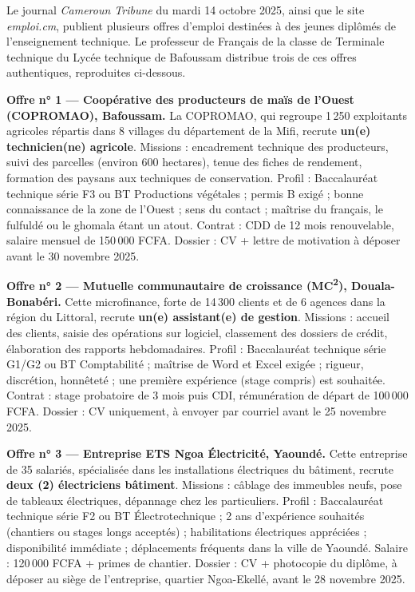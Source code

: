 \documentclass[11pt]{article}
\newcounter{popsec}
\newcounter{popsub}
\newcommand{\courssub}[1]{%
  \stepcounter{popsub}%
  \par\vspace{9pt}\noindent{\popxbold\fontsize{11.5}{13}\selectfont\color{popink}{\color{poporange}\thepopsec.\thepopsub}\hspace{6pt}#1}\par\nopagebreak\vspace{4pt}
}
\begin{document}
\courssub{Situation déclenchante}

Le journal \emph{Cameroun Tribune} du mardi 14 octobre 2025, ainsi que le site \emph{emploi.cm}, publient plusieurs offres d'emploi destinées à des jeunes diplômés de l'enseignement technique. Le professeur de Français de la classe de Terminale technique du Lycée technique de Bafoussam distribue trois de ces offres authentiques, reproduites ci-dessous.

\textbf{Offre n° 1 — Coopérative des producteurs de maïs de l'Ouest (COPROMAO), Bafoussam.} La COPROMAO, qui regroupe 1\,250 exploitants agricoles répartis dans 8 villages du département de la Mifi, recrute \textbf{un(e) technicien(ne) agricole}. Missions : encadrement technique des producteurs, suivi des parcelles (environ 600 hectares), tenue des fiches de rendement, formation des paysans aux techniques de conservation. Profil : Baccalauréat technique série F3 ou BT Productions végétales ; permis B exigé ; bonne connaissance de la zone de l'Ouest ; sens du contact ; maîtrise du français, le fulfuldé ou le ghomala étant un atout. Contrat : CDD de 12 mois renouvelable, salaire mensuel de 150\,000 FCFA. Dossier : CV + lettre de motivation à déposer avant le 30 novembre 2025.

\textbf{Offre n° 2 — Mutuelle communautaire de croissance (MC\textsuperscript{2}), Douala-Bonabéri.} Cette microfinance, forte de 14\,300 clients et de 6 agences dans la région du Littoral, recrute \textbf{un(e) assistant(e) de gestion}. Missions : accueil des clients, saisie des opérations sur logiciel, classement des dossiers de crédit, élaboration des rapports hebdomadaires. Profil : Baccalauréat technique série G1/G2 ou BT Comptabilité ; maîtrise de Word et Excel exigée ; rigueur, discrétion, honnêteté ; une première expérience (stage compris) est souhaitée. Contrat : stage probatoire de 3 mois puis CDI, rémunération de départ de 100\,000 FCFA. Dossier : CV uniquement, à envoyer par courriel avant le 25 novembre 2025.

\textbf{Offre n° 3 — Entreprise ETS Ngoa Électricité, Yaoundé.} Cette entreprise de 35 salariés, spécialisée dans les installations électriques du bâtiment, recrute \textbf{deux (2) électriciens bâtiment}. Missions : câblage des immeubles neufs, pose de tableaux électriques, dépannage chez les particuliers. Profil : Baccalauréat technique série F2 ou BT Électrotechnique ; 2 ans d'expérience souhaités (chantiers ou stages longs acceptés) ; habilitations électriques appréciées ; disponibilité immédiate ; déplacements fréquents dans la ville de Yaoundé. Salaire : 120\,000 FCFA + primes de chantier. Dossier : CV + photocopie du diplôme, à déposer au siège de l'entreprise, quartier Ngoa-Ekellé, avant le 28 novembre 2025.
\end{document}
